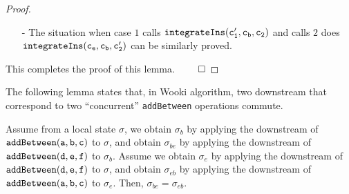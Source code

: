 \begin {proof}
\begin{itemize}
\begin{itemize}
        \begin{itemize}
        \setlength{\itemsep}{0.5pt}
        \item[-] If $c_b <_{id} c'''_n$, then, case $1$ and case $2$ work in the same way.

        \item[-] Else, we can see that $c'''_n <_{id} c_b <_{id} c_e$, case $1$ recursively calls $\alabelshort[{\tt integrateIns}]{c'''_n,c_b,_c}$, and case $2$ recursively calls $\alabelshort[{\tt integrateIns}]{c'''_n,c_b,c_e}$. We can see that the order of $\{ c'''_1,\ldots,c'''_n,c_b \}$ is the same for case $1$ and case $2$.
        \end{itemize}

    \item[-] Let us consider the situation of $c''_n <_{\sigma_e} c_e$. Similarly, we can prove the $c''_n <_{id} c_e$. Therefore, we have $c''_1 <_{id} \ldots <_{id} c''_n <_{id} c_e$. Then,
        \begin{itemize}
        \setlength{\itemsep}{0.5pt}
        \item[-] If $c_b <_{id} c''_n$, then, case $1$ and case $2$ work in the same way.

        \item[-] Else, if $c''_n <_{id} c_b <_{id} c_e$, case $1$ recursively calls $\alabelshort[{\tt integrateIns}]{c''_n,c_b,c'_2}$, and case $2$ recursively calls $\alabelshort[{\tt integrateIns}]{c''_n,c_b,c_e}$. We can see that the order of $\{ c''_1,\ldots,c''_n,c_b \}$ is the same for case $1$ and case $2$.
        \end{itemize}
    \end{itemize}

\item[-] The situation when case $1$ calls $\alabelshort[{\tt integrateIns}]{c'_1,c_b,c_2}$ and calls $2$ does $\alabelshort[{\tt integrateIns}]{c_e,c_b,c'_2}$ can be similarly proved.
\end{itemize}

This completes the proof of this lemma. $\qed$
\end {proof}



The following lemma states that, in Wooki algorithm, two downstream that correspond to two ``concurrent'' {\tt addBetween} operations commute.

\begin{lemma}
\label{lemma:in Wooki algorithm, two downstreams of two addBetween operations commute}
Assume from a local state $\sigma$, we obtain $\sigma_b$ by applying the downstream of $\alabelshort[{\tt addBetween}]{a,b,c}$ to $\sigma$, and obtain $\sigma_{be}$ by applying the downstream of $\alabelshort[{\tt addBetween}]{d,e,f}$ to $\sigma_b$. Assume we obtain $\sigma_e$ by applying the downstream of $\alabelshort[{\tt addBetween}]{d,e,f}$ to $\sigma$, and obtain $\sigma_{eb}$ by applying the downstream of $\alabelshort[{\tt addBetween}]{a,b,c}$ to $\sigma_e$. Then, $\sigma_{be} = \sigma_{eb}$.
\end{lemma}


